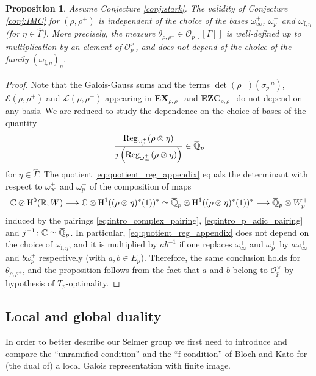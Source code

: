 \documentclass[12pt]{amsart}
\newcommand\bR{\mathbb{R}}
\newcommand\bC{\mathbb{C}}
\newcommand\bQ{\mathbb{Q}}
\newcommand\cE{\mathcal{E}}
\newcommand\cL{\mathcal{L}}
\newcommand\cO{\mathcal{O}}
\newcommand{\ob}[1]{\mkern 1.5mu\overline{\mkern-1.5mu#1\mkern-1.5mu}\mkern 1.5mu}
\DeclareMathOperator{\Reg}{Reg}
\newcommand{\HH}{\mathrm{H}}
\newcommand{\ff}{\mathrm{f}}
\theoremstyle{defstyle}
\theoremstyle{thmstyle}
\newtheorem{proposition}[subsubsection]{Proposition}
\begin{document}
\begin{proposition}\label{prop:dependence_theta_on_bases}
	Assume Conjecture \ref{conj:stark}. The validity of Conjecture \ref{conj:IMC} for $(\rho,\rho^+)$ is independent of the choice of the bases $\omega_\infty^+$, $\omega_p^+$ and $\omega_{\ff,\eta}$ (for ${\eta\in\widehat{\Gamma}}$). More precisely, the measure $\theta_{\rho,\rho^+}\in \cO_p[[\Gamma]]$ is well-defined up to multiplication by an element of $\cO_p^\times$, and does not depend of the choice of the family $(\omega_{\ff,\eta})_{\eta}$.
\end{proposition}
\begin{proof}
	Note that the Galois-Gauss sums and the terms $\det(\rho^-)(\sigma_p^{-n})$, $\cE(\rho,\rho^+)$ and $\cL(\rho,\rho^+)$ appearing in \textbf{EX}$_{\rho,\rho^+}$ and \textbf{EZC}$_{\rho,\rho^+}$ do not depend on any basis. We are reduced to study the dependence on the choice of bases of the quantity 
	\begin{equation}\label{eq:quotient_reg_appendix}
		\frac{\Reg_{\omega_p^+}(\rho\otimes\eta)}{j\left(\Reg_{\omega_\infty^+}(\rho\otimes\eta)\right)} \in \ob{\bQ}_p
	\end{equation}
	for $\eta\in \widehat{\Gamma}$. The quotient \eqref{eq:quotient_reg_appendix} equals the determinant with respect to $\omega_\infty^+$ and $\omega_p^+$ of the composition of maps
	\[
	\bC \otimes \HH^0(\bR,W) \longrightarrow \bC \otimes \HH^1((\rho\otimes\eta)^*(1))^* \simeq \ob{
		\bQ}_p  \otimes \HH^1((\rho\otimes\eta)^*(1))^* \longrightarrow\ob{\bQ}_p  \otimes W_p^+
	\]
	induced by the pairings \eqref{eq:intro_complex_pairing}, \eqref{eq:intro_p_adic_pairing} and $j^{-1}\colon \bC\simeq\ob{\bQ}_p$. In particular, \eqref{eq:quotient_reg_appendix} does not depend on the choice of $\omega_{\ff,\eta}$, and it is multiplied by $ab^{-1}$ if one replaces ${\omega}_\infty^+$ and ${\omega}_p^+$ by $a\omega_\infty^+$ and $b\omega_p^+$ respectively (with $a,b\in E_p$). Therefore, the same conclusion holds for $\theta_{\rho,\rho^+}$, and the proposition follows from the fact that $a$ and $b$ belong to $\cO_p^\times$ by hypothesis of $T_p$-optimality.
\end{proof}




\subsection{Local and global duality}\label{sec:duality}
In order to better describe our Selmer group we first need to introduce and compare the ``unramified condition'' and the ``$\ff$-condition'' of Bloch and Kato for (the dual of) a local Galois representation with finite image. 
\end{document}
